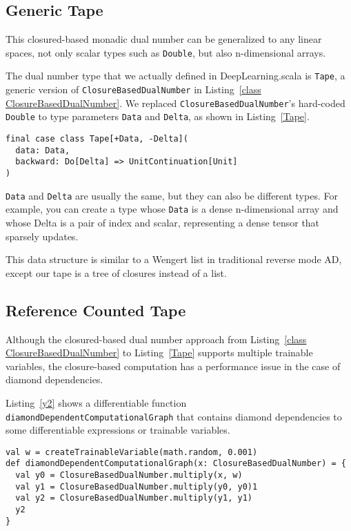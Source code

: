 \subsection{Generic Tape}
\label{generic tape}

This closured-based monadic dual number can be generalized to any linear spaces, not only scalar types such as \lstinline{Double}, but also n-dimensional arrays.

The dual number type that we actually defined in DeepLearning.scala is \lstinline{Tape}, a generic version of \lstinline{ClosureBasedDualNumber} in Listing~\ref{class ClosureBasedDualNumber}. We replaced \lstinline{ClosureBasedDualNumber}'s hard-coded \lstinline{Double} to type parameters \lstinline{Data} and \lstinline{Delta}, as shown in Listing~\ref{Tape}.

\begin{lstlisting}[float={h t b p},caption={Generic closured-based monadic dual number}, label={Tape}]
final case class Tape[+Data, -Delta](
  data: Data,
  backward: Do[Delta] => UnitContinuation[Unit]
)
\end{lstlisting}

\lstinline{Data} and \lstinline{Delta} are usually the same, but they can also be different types. For example, you can create a type whose \lstinline{Data} is a dense n-dimensional array and whose {Delta} is a pair of index and scalar, representing a dense tensor that sparsely updates.

This data structure is similar to a Wengert list in traditional reverse mode AD, except our tape is a tree of closures instead of a list.

\subsection{Reference Counted Tape}
\label{reference counted tape}

Although the closured-based dual number approach from Listing~\ref{class ClosureBasedDualNumber} to Listing~\ref{Tape} supports multiple \glspl{trainable variable}, the closure-based computation has a performance issue in the case of diamond dependencies.

Listing~\ref{y2} shows a \gls{differentiable function} \lstinline{diamondDependentComputationalGraph} that contains diamond dependencies to some \glspl{differentiable expression} or \glspl{trainable variable}.

\begin{lstlisting}[float={h t b p},caption={A diamond dependent \gls{differentiable function}}, label={y2}]
val w = createTrainableVariable(math.random, 0.001)
def diamondDependentComputationalGraph(x: ClosureBasedDualNumber) = {
  val y0 = ClosureBasedDualNumber.multiply(x, w)
  val y1 = ClosureBasedDualNumber.multiply(y0, y0)1
  val y2 = ClosureBasedDualNumber.multiply(y1, y1)
  y2
}
\end{lstlisting}

